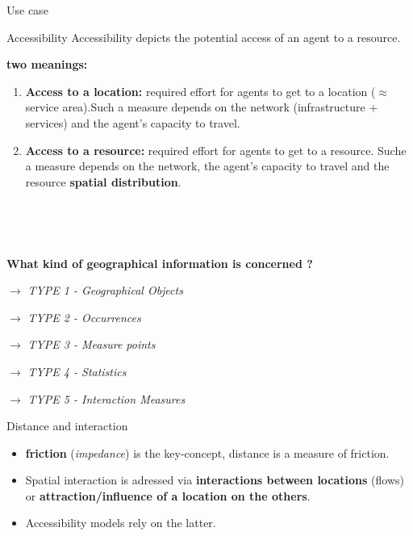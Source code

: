 \begin{frame}{Use case}


\begin{block}{Accessibility}
Accessibility depicts the potential access of an agent to a resource.

\end{block}

\textbf{two meanings:}

\begin{enumerate}
  \item \textbf{Access to a location:} required effort for agents to get to a location ($\approx$ service area).Such a measure depends on the network (infrastructure + services) and the agent's capacity to travel.
  \item \textbf{Access to a resource:} required effort for agents to get to a resource. Suche a measure depends on the network, the agent's capacity to travel and the resource \textbf{spatial distribution}.
\end{enumerate}

~

~

\textbf{What kind of geographical information is concerned ?}

$\rightarrow$ \textit{TYPE 1 - Geographical Objects}

$\rightarrow$ \textit{TYPE 2 - Occurrences}

$\rightarrow$ \textit{TYPE 3 - Measure points}

$\rightarrow$ \textit{TYPE 4 - Statistics}

$\rightarrow$ \textit{TYPE 5 - Interaction Measures}


\end{frame}



\begin{frame}{Distance and interaction}

\begin{itemize}
  \item \textbf{friction} (\textit{impedance}) is the key-concept, distance is a measure of friction.
  \item Spatial interaction is adressed via \textbf{interactions between locations} (flows) or \textbf{attraction/influence of a location on the others}. 
  \item Accessibility models rely on the latter.
\end{itemize}

\end{frame}

